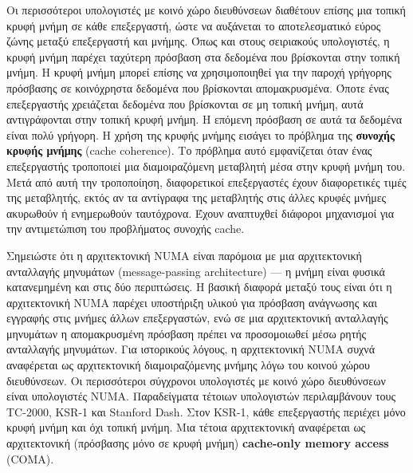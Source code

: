 \documentclass[12pt,a4paper]{article} %
\begin{document}
Οι περισσότεροι υπολογιστές με κοινό χώρο διευθύνσεων διαθέτουν επίσης 
μια τοπική κρυφή μνήμη σε κάθε επεξεργαστή, ώστε να αυξάνεται το αποτελεσματικό 
εύρος ζώνης μεταξύ επεξεργαστή και μνήμης. Όπως και στους σειριακούς 
υπολογιστές, η κρυφή μνήμη παρέχει ταχύτερη πρόσβαση στα δεδομένα που βρίσκονται 
στην τοπική μνήμη. Η κρυφή μνήμη μπορεί επίσης να χρησιμοποιηθεί για την παροχή 
γρήγορης πρόσβασης σε κοινόχρηστα δεδομένα που βρίσκονται απομακρυσμένα. 
Όποτε ένας επεξεργαστής χρειάζεται δεδομένα που βρίσκονται σε μη τοπική 
μνήμη, αυτά αντιγράφονται στην τοπική κρυφή μνήμη. Η επόμενη πρόσβαση σε αυτά 
τα δεδομένα είναι πολύ γρήγορη. Η χρήση της κρυφής μνήμης εισάγει το πρόβλημα της 
\textbf{συνοχής κρυφής μνήμης} (cache coherence). Το πρόβλημα αυτό εμφανίζεται 
όταν ένας επεξεργαστής τροποποιεί μια διαμοιραζόμενη μεταβλητή μέσα στην 
κρυφή μνήμη του. Μετά από αυτή την τροποποίηση, διαφορετικοί επεξεργαστές έχουν 
διαφορετικές τιμές της μεταβλητής, εκτός αν τα αντίγραφα της μεταβλητής στις 
άλλες κρυφές μνήμες ακυρωθούν ή ενημερωθούν ταυτόχρονα. Έχουν αναπτυχθεί διάφοροι 
μηχανισμοί για την αντιμετώπιση του προβλήματος συνοχής cache.

Σημειώστε ότι η αρχιτεκτονική NUMA είναι παρόμοια με μια αρχιτεκτονική 
ανταλλαγής μηνυμάτων (message-passing architecture) — η μνήμη είναι φυσικά 
κατανεμημένη και στις δύο περιπτώσεις. Η βασική διαφορά μεταξύ τους είναι 
ότι η αρχιτεκτονική NUMA παρέχει υποστήριξη υλικού για πρόσβαση ανάγνωσης 
και εγγραφής στις μνήμες άλλων επεξεργαστών, ενώ σε μια αρχιτεκτονική 
ανταλλαγής μηνυμάτων η απομακρυσμένη πρόσβαση πρέπει να προσομοιωθεί μέσω 
ρητής ανταλλαγής μηνυμάτων. Για ιστορικούς λόγους, η αρχιτεκτονική NUMA 
συχνά αναφέρεται ως αρχιτεκτονική διαμοιραζόμενης μνήμης λόγω του κοινού 
χώρου διευθύνσεων. Οι περισσότεροι σύγχρονοι υπολογιστές με κοινό χώρο 
διευθύνσεων είναι υπολογιστές NUMA. Παραδείγματα τέτοιων υπολογιστών 
περιλαμβάνουν τους TC-2000, KSR-1 και Stanford Dash. Στον KSR-1, κάθε 
επεξεργαστής περιέχει μόνο κρυφή μνήμη και όχι τοπική μνήμη. Μια τέτοια 
αρχιτεκτονική αναφέρεται ως αρχιτεκτονική (πρόσβασης μόνο σε κρυφή μνήμη) \textbf{cache-only memory 
access} (COMA).
\end{document}
